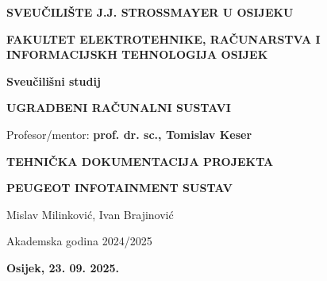 \documentclass[12pt, a4paper]{article}
\begin{document}
\sectionfont{
  \centering
  \fontsize{14}{16}
  \selectfont
}

\subsectionfont{
  \fontsize{14}{12}
  \selectfont
}

\subsubsectionfont{
  \fontsize{12}{9}
  \selectfont
}
\renewcommand\bibname{Literatura}
\renewcommand{\listingscaption}{Kod}
\newenvironment{code}{\captionsetup{type=listing}}{}


\begin{titlepage}

\begin{center}
\fontsize{14}{16}
\selectfont
\textbf{SVEUČILIŠTE J.J. STROSSMAYER U OSIJEKU}

\bigskip
\vspace{9mm}
\fontsize{12}{12}
\selectfont
\textbf{FAKULTET ELEKTROTEHNIKE, RAČUNARSTVA I INFORMACIJSKH TEHNOLOGIJA OSIJEK}

\bigskip
\vspace{9mm}
\textbf{Sveučilišni studij}

\fontsize{11}{12}
\selectfont
\bigskip
\vspace{9mm}
\textbf{UGRADBENI RAČUNALNI SUSTAVI}

\bigskip
\vspace{9mm}
Profesor/mentor: \textbf{prof. dr. sc., Tomislav Keser}

\fontsize{12}{12}
\selectfont
\bigskip
\vspace{1cm}
\textbf{TEHNIČKA DOKUMENTACIJA PROJEKTA}

\fontsize{20}{16}
\selectfont
\bigskip
\vspace{9mm}
\begin{mdframed}[backgroundcolor=black!15]
  \begin{center}
    \textbf{PEUGEOT INFOTAINMENT SUSTAV}
  \end{center}
\end{mdframed}
\fontsize{11}{12}
\selectfont

\bigskip
\vspace{9mm}
Mislav Milinković, Ivan Brajinović

\bigskip
Akademska godina 2024/2025

\vspace*{\fill}
\textbf{Osijek, 23. 09. 2025.}
\end{center}
\end{titlepage}

\fontsize{12}{12}\selectfont


\setcounter{tocdepth}{2}

\tableofcontents
\newpage

\newpage
{}







\printbibliography[heading=bibintoc, label=toc:bibliography]


\end{document}
